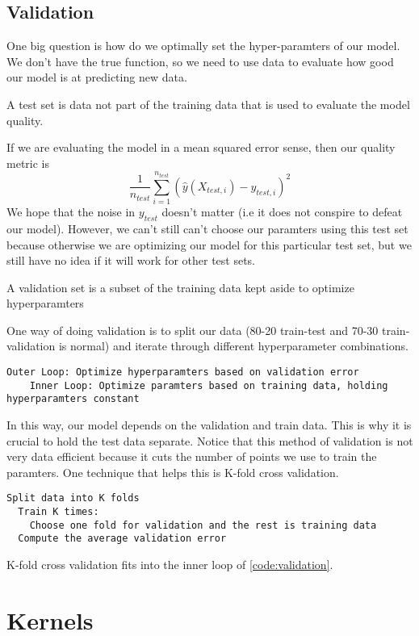 \subsection{Validation}
One big question is how do we optimally set the hyper-paramters of our model. We don't have the true function, so we need to use data to evaluate how good our model is at predicting new data.
\begin{definition}
  A test set is data not part of the training data that is used to evaluate the model quality.
  \label{defn:test-set}
\end{definition}
If we are evaluating the model in a mean squared error sense, then our quality metric is $$\frac{1}{n_{test}}\sum_{i=1}^{n_{test}}(\hat{y}(X_{test,i})-y_{test,i})^2$$
We hope that the noise in $y_{test}$ doesn't matter (i.e it does not conspire to defeat our model). However, we can't still can't choose our paramters using this test set because otherwise we are optimizing our model for this particular test set, but we still have no idea if it will work for other test sets.
\begin{definition}
  A validation set is a subset of the training data kept aside to optimize hyperparamters
  \label{defn:val-set}
\end{definition}
One way of doing validation is to split our data (80-20 train-test and 70-30 train-validation is normal) and iterate through different hyperparameter combinations.
\begin{lstlisting}[caption={Validation Pseudocode}, label={code:validation}]
  Outer Loop: Optimize hyperparamters based on validation error
    Inner Loop: Optimize paramters based on training data, holding hyperparamters constant
\end{lstlisting}
In this way, our model depends on the validation and train data. This is why it is crucial to hold the test data separate.
Notice that this method of validation is not very data efficient because it cuts the number of points we use to train the paramters. One technique that helps this is K-fold cross validation.
\begin{lstlisting}[caption={K-Fold Cross Validation Pseudocode}, label={code:k-fold}]
  Split data into K folds
  Train K times:
    Choose one fold for validation and the rest is training data
  Compute the average validation error
\end{lstlisting}
K-fold cross validation fits into the inner loop of \cref{code:validation}.

\section{Kernels}
